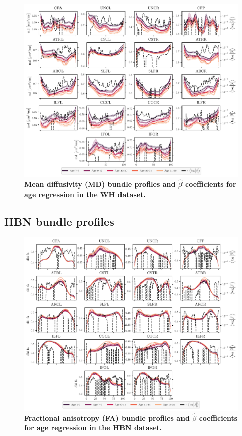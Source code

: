 \documentclass[10pt,%
               aps,%
               prl,%
               preprint,%
               superscriptaddress,%
               preprintnumbers,%
               amsmath,%
               floatfix,%
               endfloats*]{revtex4-2}
\begin{document}
\begin{figure}
    \includegraphics[width=\textwidth]{wh_coefs_profiles_md.pdf}
    \caption{%
        {%
            \bf Mean diffusivity (MD) bundle profiles and $\hat{\beta}$
            coefficients for age regression in the WH dataset.
        }
        \label{fig:wh-bp:md}
    }
\end{figure}

\subsection{HBN bundle profiles}

\begin{figure}
    \includegraphics[width=\textwidth]{hbn_coefs_profiles_fa.pdf}
    \caption{%
        {%
            \bf Fractional anisotropy (FA) bundle profiles and $\hat{\beta}$
            coefficients for age regression in the HBN dataset.
        }
        \label{fig:hbn-bp:fa}
    }
\end{figure}
\end{document}
